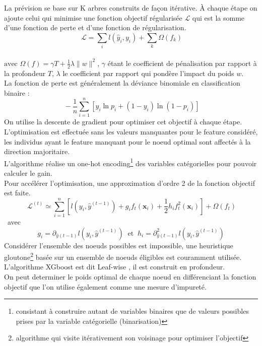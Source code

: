 \documentclass[french]{article}
\begin{document}
\begin{multicols}{2}
La prévision se base sur K arbres construits de façon itérative. À chaque étape on ajoute celui qui minimise une fonction objectif régularisée $\mathcal{L}$ qui est la somme d'une fonction de perte et d'une fonction de régularisation.\\
\[\ \mathcal{L}=\sum_{i} l\left(\hat{y}_{i}, y_{i}\right)+\sum_{k} \Omega\left(f_{k}\right) \]\\
$\text {avec } \Omega(f)=\gamma T+\frac{1}{2} \lambda\|w\|^{2}$, $\gamma$ étant le coefficient de pénalisation par rapport à la profondeur $T$, $\lambda$ le coefficient par rapport qui pondère l'impact du poids $w$.
\\
La fonction de perte est généralement la déviance binomiale en classification binaire :\\
 \[\ -\frac{1}{n} \sum_{i=1}^{n} \left[y_{i} \ln p_{i}+\left(1-y_{i}\right) \ln \left(1-p_{i}\right)\right] \]
On utilise la descente de gradient pour optimiser cet objectif à chaque étape.\\
L'optimisation est effectuée sans les valeurs manquantes pour le feature considéré, les individus ayant le feature manquant pour le noeud optimal sont affectés à la direction majoritaire.\\
L'algorithme réalise un one-hot encoding\footnote{consistant à construire autant de variables binaires que de valeurs possibles prises par la variable catégorielle (binarisation)} des variables catégorielles pour pouvoir calculer le gain.\\
Pour accélérer l'optimisation, une approximation d'ordre 2 de la fonction objectif est faite.\\
\[\ \mathcal{L}^{(t)} \simeq \sum_{i=1}^{n}\left[l\left(y_{i}, \hat{y}^{(t-1)}\right)+g_{i} f_{t}\left(\mathbf{x}_{i}\right)+\frac{1}{2} h_{i} f_{t}^{2}\left(\mathbf{x}_{i}\right)\right]+\Omega\left(f_{t}\right) \]\ 
avec  
\[ g_{i}=\partial_{\hat{y}(t-1)} l\left(y_{i}, \hat{y}^{(t-1)}\right) \ \text{ et } \ h_{i}=\partial_{\hat{y}(t-1)}^{2} l\left(y_{i}, \hat{y}^{(t-1)}\right)\]
Considérer l'ensemble des noeuds possibles est impossible, une heuristique gloutone\footnote{algorithme qui visite itérativement son voisinage pour optimiser l'objectif} basée sur un ensemble de noeuds éligibles est couramment utilisée.\\
L'algorithme XGboost est dit \og Leaf-wise \fg{}, il est construit en profondeur.\\
On peut determiner le poids optimal de chaque noeud en différenciant la fonction objectif que l'on utilise également comme une mesure d'impureté.\\

\end{multicols}
\end{document}
